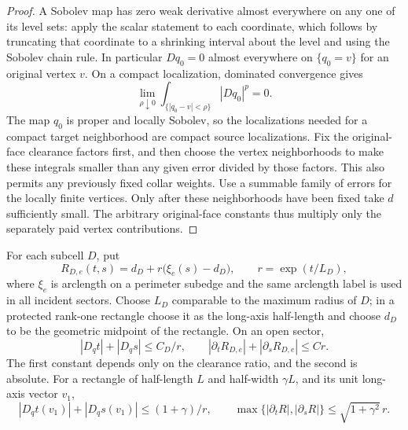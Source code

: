 \begin{proof}
A Sobolev map has zero weak derivative almost everywhere on any one
of its level sets: apply the scalar statement to each coordinate,
which follows by truncating that coordinate to a shrinking interval
about the level and using the Sobolev chain rule.  In particular
$Dq_0=0$ almost everywhere on $\{q_0=v\}$ for an original vertex $v$.
On a compact localization, dominated convergence gives
\[
 \lim_{\rho\downarrow0}
 \int_{\{|q_0-v|<\rho\}}|Dq_0|^p=0.
\]
The map $q_0$ is proper and locally Sobolev, so the localizations needed
for a compact target neighborhood are compact source localizations.
Fix the original-face clearance factors first, and then choose the
vertex neighborhoods to make these integrals smaller than any given
error divided by those factors.  This also permits any previously
fixed collar weights.  Use a summable family of errors for the locally
finite vertices.  Only after these neighborhoods have been fixed take
$d$ sufficiently small.  The arbitrary original-face constants thus
multiply only the separately paid vertex contributions.
\end{proof}

\begin{lemma}\label{qt:polar}
For each subcell $D$, put
\[
 R_{D,e}(t,s)=d_D+r\bigl(\xi_e(s)-d_D\bigr),\qquad
 r=\exp(t/L_D),
\]
where $\xi_e$ is arclength on a perimeter subedge and the same arclength
label is used in all incident sectors.  Choose $L_D$ comparable to the
maximum radius of $D$; in a protected rank-one rectangle choose it
as the long-axis half-length and choose $d_D$ to be the geometric
midpoint of the rectangle.  On an open sector,
\begin{equation}\label{qt:polar-bounds}
 |D_qt|+|D_qs|\leq C_D/r,\qquad
 |\partial_tR_{D,e}|+|\partial_sR_{D,e}|\leq C r.
\end{equation}
The first constant depends only on the clearance ratio, and the second
is absolute.  For a rectangle of half-length $L$ and half-width
$\gamma L$, and its unit long-axis vector $v_1$,
\begin{equation}\label{qt:rank-one-polar}
 |D_qt(v_1)|+|D_qs(v_1)|\leq(1+\gamma)/r,
 \qquad
 \max\{|\partial_tR|,|\partial_sR|\}
 \leq\sqrt{1+\gamma^2}\,r.
\end{equation}
\end{lemma}

